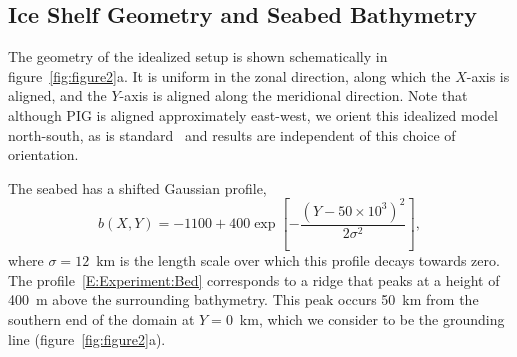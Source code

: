 \documentclass[draft]{agujournal2019}
\begin{document}
\subsection{Ice Shelf Geometry and Seabed Bathymetry}\label{S:Experiment:Geometry}
The geometry of the idealized setup is shown schematically in figure~\ref{fig:figure2}a. It is uniform in the zonal direction, along which the $X$-axis is aligned, and the $Y$-axis is aligned along the meridional direction. Note that although PIG is aligned approximately east-west, we orient this idealized model north-south, as is standard~\cite{Grosfeld1997JGROceans, DeRydt2014JGeophysResOceans} and results are independent of this choice of orientation.

The seabed has a shifted Gaussian profile,
\begin{equation}\label{E:Experiment:Bed}
    b(X,Y) = -1100 + 400 \exp\left[-\frac{\left(Y - 50\times 10^3\right)^2}{2\sigma^2}\right],
\end{equation}
where $\sigma = 12$~km is the length scale over which this profile decays towards zero. The profile~\eqref{E:Experiment:Bed} corresponds to a ridge that peaks at a height of 400~m above the surrounding bathymetry. This peak occurs 50 km from the southern end of the domain at $Y=0$~km, which we consider to be the grounding line (figure~\ref{fig:figure2}a).
\end{document}

